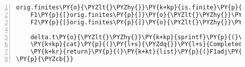 \begin{Verbatim}[commandchars=\\\{\},codes={\catcode`\$=3\catcode`\^=7\catcode`\_=8},gobble=0,numbers=left,fontfamily=fvm,fontshape=n,fontsize=\footnotesize,tabsize=2]
	orig.finites\PY{o}{\PYZlt{}\PYZhy{}}\PY{k+kp}{is.finite}\PY{p}{(}M\PY{p}{)} \PY{c+c1}{\PYZsh{}update values requiring updating}
	F1\PY{p}{[}orig.finites\PY{p}{]}\PY{o}{\PYZlt{}\PYZhy{}}\PY{l+m}{2}\PY{o}{\PYZca{}}\PY{p}{(}A\PY{p}{[}orig.finites\PY{p}{]}\PY{o}{+}M.dash\PY{p}{[}orig.finites\PY{p}{]}\PY{o}{/}\PY{l+m}{2}\PY{p}{)}
	F2\PY{p}{[}orig.finites\PY{p}{]}\PY{o}{\PYZlt{}\PYZhy{}}\PY{l+m}{2}\PY{o}{\PYZca{}}\PY{p}{(}A\PY{p}{[}orig.finites\PY{p}{]}\PY{o}{\PYZhy{}}M.dash\PY{p}{[}orig.finites\PY{p}{]}\PY{o}{/}\PY{l+m}{2}\PY{p}{)}
	
	delta.t\PY{o}{\PYZlt{}\PYZhy{}}\PY{k+kp}{sprintf}\PY{p}{(}\PY{l+s}{\PYZdq{}}\PY{l+s}{\PYZpc{}.2f\PYZdq{}}\PY{p}{,}\PY{k+kp}{proc.time}\PY{p}{(}\PY{p}{)}\PY{p}{[}\PY{l+m}{3}\PY{p}{]}\PY{o}{\PYZhy{}}t1\PY{p}{)} \PY{c+c1}{\PYZsh{}\PYZsh{}\PYZsh{} time elapsed}
	\PY{k+kp}{cat}\PY{p}{(}\PY{l+s}{\PYZdq{}}\PY{l+s}{Completed MA Normalisation in\PYZdq{}}\PY{p}{,}delta.t\PY{p}{,}\PY{l+s}{\PYZdq{}}\PY{l+s}{seconds \PYZbs{}n\PYZdq{}}\PY{p}{)}
	\PY{k+kr}{return}\PY{p}{(}\PY{k+kt}{list}\PY{p}{(}F1adj\PY{o}{=}F1\PY{p}{,}F2adj\PY{o}{=}F2\PY{p}{)}\PY{p}{)}
\PY{p}{\PYZcb{}}	
\end{Verbatim}
